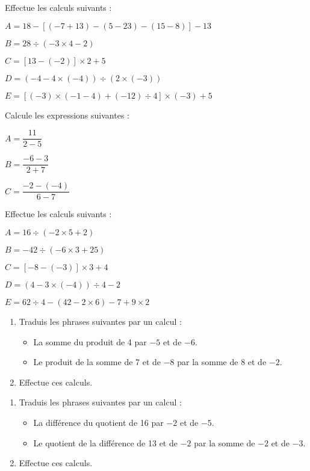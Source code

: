 \begin{exercice}Effectue les calculs suivants :

$A = 18 -[(-7 +13 ) -( 5 -23) -( 15 -8 )] -13$

$B = 28 \div (-3 \times 4 -2)$

$C = [13 -(-2)] \times 2 +5$

$D = (- 4 - 4 \times (- 4)) \div (2 \times (- 3))$

$E = [(-3) \times (-1 -4) +(-12) \div 4] \times (-3) +5$
\end{exercice}




\begin{exercice}Calcule les expressions suivantes :

$A = \dfrac{11}{2-5}$

$B = \dfrac{-6-3}{2+7}$

$C = \dfrac{-2-(-4)}{6-7}$
\end{exercice}



\begin{exercice}Effectue les calculs suivants :

$A = 16 \div (-2 \times 5 +2)$

$B = - 42 \div (-6 \times 3 +25)$

$C = [-8 -(-3)] \times 3 +4$

$D = (4 - 3 \times (- 4)) \div 4 -2$

$E = 62 \div 4 -(42 -2 \times 6) -7 +9 \times 2$
\end{exercice}




\begin{exercice}[Vocabulaire]
\begin{enumerate}
\item Traduis les phrases suivantes par un calcul :
    \begin{itemize}
    \item La somme du produit de 4 par $-5$ et de $-6$.
    \item Le produit de la somme de 7 et de $-8$ par la somme de 8 et de $-2$.
    \end{itemize}
\item Effectue ces calculs.
\end{enumerate}
\end{exercice}


\begin{exercice}
\begin{enumerate}
\item Traduis les phrases suivantes par un calcul :
    \begin{itemize}
    \item La différence du quotient de 16 par $-2$ et de $-5$.
    \item Le quotient de la différence de 13 et de $-2$ par la somme de $-2$ et de $-3$.
    \end{itemize}
\item Effectue ces calculs.
\end{enumerate}
\end{exercice}



